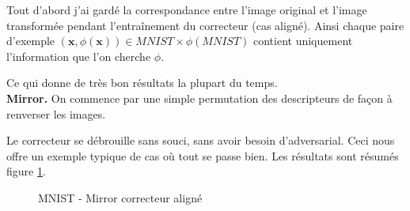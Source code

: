 
Tout d'abord j'ai gardé la correspondance entre l'image original et
l'image transformée pendant l'entraînement du correcteur (cas aligné).
Ainsi chaque paire d'exemple $(\pmb{x}, \phi(\pmb{x})) \in MNIST\times \phi(MNIST)$
contient uniquement l'information que l'on cherche $\phi$.

Ce qui donne de très bon résultats la plupart du temps.\\


{\Large\textbf{Mirror.}} On commence par une simple permutation des 
descripteurs de façon à renverser les images.

Le correcteur se débrouille sans souci, sans avoir besoin d'adversarial. Ceci
nous offre un exemple typique de cas où tout se passe bien. Les résultats sont résumés
figure \ref{fig:mnist_mirror_pairwise}.

\begin{figure}[H] %
\centering
{}
\hfill
{}
\caption{MNIST - Mirror correcteur aligné}
\label{fig:mnist_mirror_pairwise}
\end{figure}


